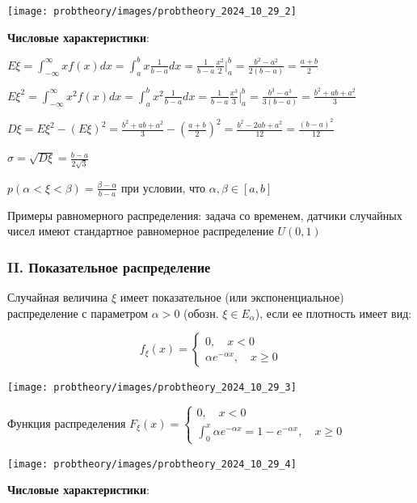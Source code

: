 \documentclass[12pt]{article}
\begin{document}
    \texttt{[image: probtheory/images/probtheory\_2024\_10\_29\_2]}

    \textbf{Числовые характеристики}:

    $E\xi = \int_{-\infty}^\infty x f(x) dx = \int_a^b x \frac{1}{b - a} dx = \frac{1}{b - a} \frac{x^2}{2} \Big|_a^b = \frac{b^2 - a^2}{2(b - a)} = \frac{a + b}{2}$

    $E\xi^2 = \int_{-\infty}^\infty x^2 f(x) dx = \int_a^b x^2 \frac{1}{b - a} dx = \frac{1}{b - a} \frac{x^3}{3} \Big|_a^b = \frac{b^3 - a^3}{3(b - a)} = \frac{b^2 + ab + a^2}{3}$

    $D\xi = E\xi^2 - (E\xi)^2 = \frac{b^2 + ab + a^2}{3} - \left(\frac{a + b}{2}\right)^2 = \frac{b^2 - 2ab + a^2}{12} = \frac{(b - a)^2}{12}$
    
    $\sigma = \sqrt{D\xi} = \frac{b - a}{2\sqrt{3}}$

    $p(\alpha < \xi < \beta) = \frac{\beta - \alpha}{b - a}$ при условии, что $\alpha, \beta \in [a, b]$

    \Nota Примеры равномерного распределения: задача со временем, датчики случайных чисел имеют стандартное равномерное распределение $U(0, 1)$

    \hypertarget{exponentialdistribution}{}

    \subsubsection{II. Показательное распределение}

    \Defs Случайная величина $\xi$ имеет показательное (или экспоненциальное) распределение с параметром $\alpha > 0$ (обозн. $\xi \in E_\alpha$),
    если ее плотность имеет вид:

    \[f_\xi(x) = \begin{cases}0, \quad x < 0 \\ \alpha e^{-\alpha x}, \quad x \geq 0\end{cases}\]

    \texttt{[image: probtheory/images/probtheory\_2024\_10\_29\_3]}

    Функция распределения $F_\xi(x) = \begin{cases}0, \quad x < 0 \\ \int_0^x \alpha e^{-\alpha x} = 1 - e^{-\alpha x}, \quad x \geq 0\end{cases}$

    \texttt{[image: probtheory/images/probtheory\_2024\_10\_29\_4]}

    \textbf{Числовые характеристики}:
\end{document}

